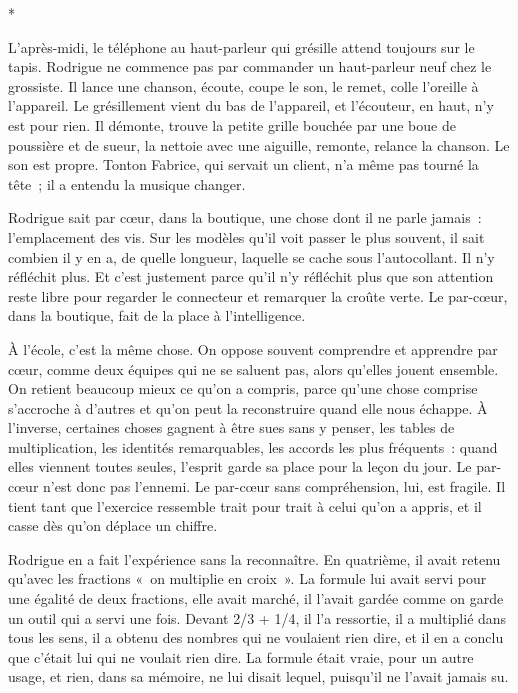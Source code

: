 \documentclass[10.5pt,twoside,openright]{book}
\newcommand{\asterisme}{\par\vspace{0.7em}\centerline{\color{gris}*\quad*\quad*}\vspace{0.7em}\par\noindent}
\begin{document}
\asterisme

L’après-midi, le téléphone au haut-parleur qui grésille attend toujours sur le tapis. Rodrigue ne commence pas par commander un haut-parleur neuf chez le grossiste. Il lance une chanson, écoute, coupe le son, le remet, colle l’oreille à l’appareil. Le grésillement vient du bas de l’appareil, et l’écouteur, en haut, n’y est pour rien. Il démonte, trouve la petite grille bouchée par une boue de poussière et de sueur, la nettoie avec une aiguille, remonte, relance la chanson. Le son est propre. Tonton Fabrice, qui servait un client, n’a même pas tourné la tête ; il a entendu la musique changer.

Rodrigue sait par cœur, dans la boutique, une chose dont il ne parle jamais : l’emplacement des vis. Sur les modèles qu’il voit passer le plus souvent, il sait combien il y en a, de quelle longueur, laquelle se cache sous l’autocollant. Il n’y réfléchit plus. Et c’est justement parce qu’il n’y réfléchit plus que son attention reste libre pour regarder le connecteur et remarquer la croûte verte. Le par-cœur, dans la boutique, fait de la place à l’intelligence.

À l’école, c’est la même chose. On oppose souvent comprendre et apprendre par cœur, comme deux équipes qui ne se saluent pas, alors qu’elles jouent ensemble. On retient beaucoup mieux ce qu’on a compris, parce qu’une chose comprise s’accroche à d’autres et qu’on peut la reconstruire quand elle nous échappe. À l’inverse, certaines choses gagnent à être sues sans y penser, les tables de multiplication, les identités remarquables, les accords les plus fréquents : quand elles viennent toutes seules, l’esprit garde sa place pour la leçon du jour. Le par-cœur n’est donc pas l’ennemi. Le par-cœur sans compréhension, lui, est fragile. Il tient tant que l’exercice ressemble trait pour trait à celui qu’on a appris, et il casse dès qu’on déplace un chiffre.

Rodrigue en a fait l’expérience sans la reconnaître. En quatrième, il avait retenu qu’avec les fractions « on multiplie en croix ». La formule lui avait servi pour une égalité de deux fractions, elle avait marché, il l’avait gardée comme on garde un outil qui a servi une fois. Devant 2/3 + 1/4, il l’a ressortie, il a multiplié dans tous les sens, il a obtenu des nombres qui ne voulaient rien dire, et il en a conclu que c’était lui qui ne voulait rien dire. La formule était vraie, pour un autre usage, et rien, dans sa mémoire, ne lui disait lequel, puisqu’il ne l’avait jamais su.
\end{document}

